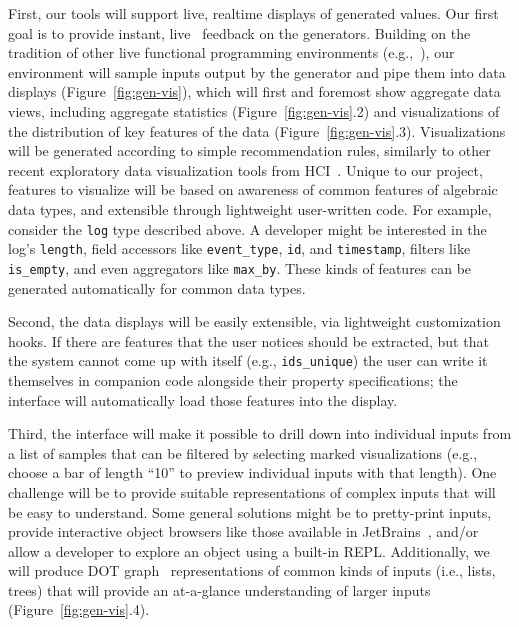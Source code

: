 First, our tools will support live, realtime displays of generated values.
Our first goal is to provide
instant, live~\cite{ref:tanimoto1990viva} feedback on the generators. Building
on the tradition of other live functional programming environments
(e.g.,~\cite{tool:lighttable,ref:omar2019live}),
our environment will sample inputs
output by the generator and
pipe them into data displays (Figure~\ref{fig:gen-vis}), which
will first and foremost show aggregate data views, including aggregate
statistics (Figure~\ref{fig:gen-vis}.2) and visualizations of the distribution
of key features of the data (Figure~\ref{fig:gen-vis}.3). Visualizations will be
generated according to simple recommendation rules, similarly to other recent
exploratory data visualization tools from
HCI~\cite{ref:lee2021lux,wongsuphasawat_voyager_2016,
wongsuphasawat_voyager_2017}. Unique to our project, features to visualize will
be based on awareness of common features of algebraic data types, and extensible
through lightweight user-written code. For example, consider the
\lstinline{log} type
described above. A developer might be interested in the log's
\lstinline{length}, field accessors like \lstinline{event_type}, \lstinline{id},
and \lstinline{timestamp}, filters like \lstinline{is_empty}, and even
aggregators like \lstinline{max_by}. These kinds of features can be
generated automatically for common data types.

Second, the data displays will be easily extensible, via lightweight customization hooks. If
there are features that the user notices should be extracted, but that the
system cannot come up with itself (e.g., \lstinline{ids_unique}) the user can
write it themselves in companion code alongside their property specifications;
the interface will automatically load those features into the display.

Third, the interface will make it possible to drill down into
individual inputs from a list of samples that can be
filtered by selecting marked visualizations (e.g., choose a bar
of length ``10'' to preview individual inputs with that length). One
challenge will be to provide suitable representations of complex inputs that
will be easy to understand. Some general solutions might be to
pretty-print inputs, provide interactive object browsers like those available
in JetBrains~\cite{tool:jetbrains}, and/or allow a developer to explore an
object using a built-in REPL. Additionally, we will produce DOT
graph~\cite{ellson_graphviz_2002} representations of common kinds of inputs
(i.e., lists, trees) that will provide an at-a-glance understanding of
larger inputs (Figure~\ref{fig:gen-vis}.4).

